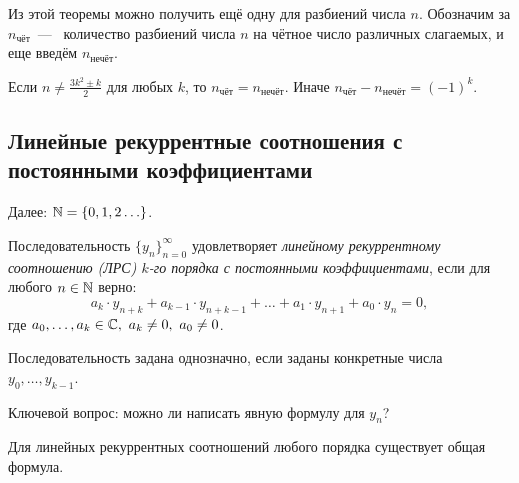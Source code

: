 Из этой теоремы можно получить ещё одну для разбиений числа $n$. Обозначим за $n_{\text{чёт}}$~---~ количество разбиений числа $n$ на чётное число различных слагаемых, и еще введём $n_{\text{нечёт}}$.

\begin{theorem}
	Если $n \neq \frac{3k^2 \pm k}{2}$ для любых $k$, то $n_{\text{чёт}} = n_{\text{нечёт}}$. Иначе $n_{\text{чёт}} - n_{\text{нечёт}} = (-1)^k$.
\end{theorem}

\subsection{Линейные рекуррентные соотношения с постоянными коэффициентами}

\begin{note}
	Далее: $\mathbb{N} = \{0, 1, 2 \ldots\}$.
\end{note}

\begin{definition}
	Последовательность $\{y_n\}_{n = 0}^\infty$ удовлетворяет \textit{линейному рекуррентному соотношению (ЛРС) $k$-го порядка с постоянными коэффициентами}, если для любого $n \in \mathbb{N}$ верно:
	\[
		a_k \cdot y_{n + k} + a_{k - 1} \cdot y_{n + k - 1} + \ldots + a_1 \cdot y_{n + 1} + a_0 \cdot y_n = 0,
	\]
	где $a_0, \ldots, a_k \in \Cm,\ a_k \neq 0,\ a_0 \neq 0$.
\end{definition}

\begin{note}
	Последовательность задана однозначно, если заданы конкретные \linebreak числа $y_0, \ldots, y_{k - 1}$.
\end{note}

Ключевой вопрос: можно ли написать явную формулу для $y_n$?

\begin{proposition}
	Для линейных рекуррентных соотношений любого порядка существует общая формула.
\end{proposition}

